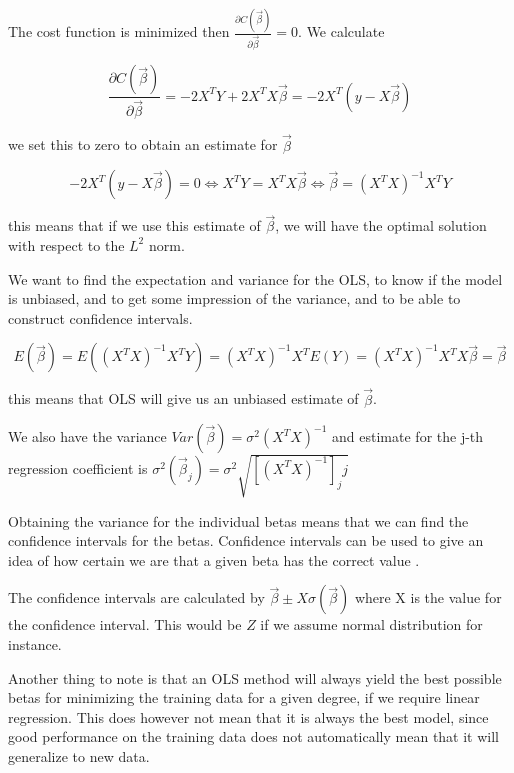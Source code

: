 \documentclass[12pt]{article}
\newcommand{\bbeta}{\vec{\beta}}
\newcommand{\hes}{X^TX}
\begin{document}
The cost function is minimized then $\frac{\partial C(\bbeta)}{\partial \bbeta} = 0$. We calculate

\begin{equation}\label{eq:cost_ols_differentiated}
    \frac{\partial C(\bbeta)}{\partial \bbeta} = -2 X^T Y + 2 X^T X \bbeta = -2 X^T (y - X \bbeta)
\end{equation}

we set this to zero to obtain an estimate for $\bbeta$

\begin{equation}\label{eq:optimal_beta_ols}
    -2 X^T (y - X \bbeta) = 0 \iff X^T Y = X^T X \bbeta \iff \bbeta = (X^T X)^{-1} X^T Y
\end{equation}

this means that if we use this estimate of $\bbeta$, we will have the optimal solution with respect to the $L^2$ norm.

We want to find the expectation and variance for the OLS, to know if the model is unbiased, and to get some impression of the variance, and to be able to construct confidence intervals.

\begin{equation}
    E(\bbeta)
    =E((\hes)^{-1}X^T Y)=(\hes)^{-1} X^T E(Y)
    = (\hes)^{-1} \hes \bbeta
    = \bbeta
\end{equation}

this means that OLS will give us an unbiased estimate of $\bbeta$.

We also have the variance $Var(\bbeta)=\sigma^2 (X^TX)^{-1}$ and estimate for the j-th regression coefficient is $\sigma^2(\bbeta_j)=\sigma^2 \sqrt{[(\hes)^{-1}]_jj}$

Obtaining the variance for the individual betas means that we can find the confidence intervals for the betas.
Confidence intervals can be used to give an idea of how certain we are that a given beta has the correct value \cite{lecture notes two}.

The confidence intervals are calculated by $\bbeta \pm X \sigma(\bbeta)$ where X is the value for the confidence interval. This would be $Z$ if we assume normal distribution for instance.

Another thing to note is that an OLS method will always yield the best possible betas for minimizing the training data for a given degree, if we require linear regression.
This does however not mean that it is always the best model, since good performance on the training data does not automatically mean that it will generalize to new data.
\end{document}
